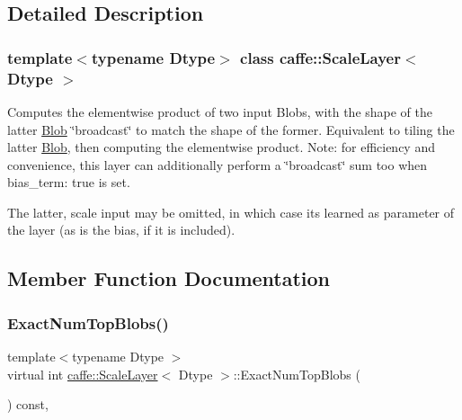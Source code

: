 \subsection{Detailed Description}
\subsubsection*{template$<$typename Dtype$>$\newline
class caffe\+::\+Scale\+Layer$<$ Dtype $>$}

Computes the elementwise product of two input Blobs, with the shape of the latter \mbox{\hyperlink{classcaffe_1_1_blob}{Blob}} \char`\"{}broadcast\char`\"{} to match the shape of the former. Equivalent to tiling the latter \mbox{\hyperlink{classcaffe_1_1_blob}{Blob}}, then computing the elementwise product. Note\+: for efficiency and convenience, this layer can additionally perform a \char`\"{}broadcast\char`\"{} sum too when {\ttfamily bias\+\_\+term\+: true} is set. 

The latter, scale input may be omitted, in which case it\textquotesingle{}s learned as parameter of the layer (as is the bias, if it is included). 

\subsection{Member Function Documentation}
\mbox{\label{classcaffe_1_1_scale_layer_aeffb8fcfc522f7365c23b0e6ae5c232e}} 
\subsubsection{\texorpdfstring{Exact\+Num\+Top\+Blobs()}{ExactNumTopBlobs()}\hspace{0.1cm}{\footnotesize\ttfamily [1/2]}}
{\footnotesize\ttfamily template$<$typename Dtype $>$ \\
virtual int \mbox{\hyperlink{classcaffe_1_1_scale_layer}{caffe\+::\+Scale\+Layer}}$<$ Dtype $>$\+::Exact\+Num\+Top\+Blobs (\begin{DoxyParamCaption}{ }\end{DoxyParamCaption}) const\hspace{0.3cm}{\ttfamily [inline]}, {\ttfamily [virtual]}}



